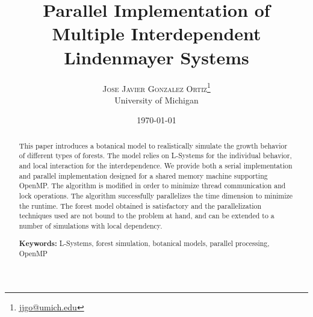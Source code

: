 \documentclass[letterpaper,twoside,11pt]{article}
\title{\vspace{-15mm}\fontsize{24pt}{10pt}\selectfont\textbf{Parallel Implementation of Multiple Interdependent Lindenmayer Systems}} %
\author{
\large
\textsc{Jose Javier Gonzalez Ortiz}\thanks{\href{mailto:jjgo@umich.edu}{jjgo@umich.edu}}\\[2mm] %
\normalsize University of Michigan \\ %
}
\date{\today}
\begin{document}
\maketitle %

\thispagestyle{fancy} %

\vspace{-1em}
\begin{abstract}

\noindent This paper introduces a botanical model to realistically simulate the growth behavior of different types of forests. The model relies on L-Systems for the individual behavior, and local interaction for the interdependence. We provide both a serial implementation and parallel implementation designed for a shared memory machine supporting OpenMP. The algorithm is modified in order to minimize thread communication and lock operations. The algorithm successfully parallelizes the time dimension to minimize the runtime. The forest model obtained is satisfactory and the parallelization techniques used are not bound to the problem at hand, and can be extended to a number of  simulations with local dependency.

\textbf{Keywords:} L-Systems, forest simulation, botanical models, parallel processing, OpenMP
\end{abstract}

\end{document}
